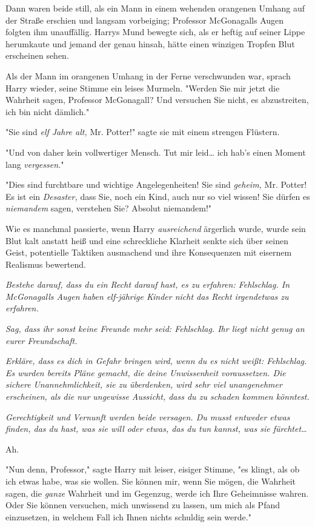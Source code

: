 {Dann waren beide still, als ein Mann in einem wehenden orangenen Umhang auf der Straße erschien und langsam vorbeiging; Professor McGonagalls Augen folgten ihm unauffällig. Harrys Mund bewegte sich, als er heftig auf seiner Lippe herumkaute und jemand der genau hinsah, hätte einen winzigen Tropfen Blut erscheinen sehen.

Als der Mann im orangenen Umhang in der Ferne verschwunden war, sprach Harry wieder, seine Stimme ein leises Murmeln. "Werden Sie mir jetzt die Wahrheit sagen, Professor McGonagall? Und versuchen Sie nicht, es abzustreiten, ich bin nicht dämlich."

"Sie sind \emph{elf Jahre alt,} Mr. Potter!" sagte sie mit einem strengen Flüstern.

"Und von daher kein vollwertiger Mensch. Tut mir leid… ich hab's einen Moment lang \emph{vergessen.}"

"Dies sind furchtbare und wichtige Angelegenheiten! Sie sind \emph{geheim,} Mr. Potter! Es ist ein \emph{Desaster,} dass Sie, noch ein Kind, auch nur so viel wissen! Sie dürfen es \emph{niemandem} sagen, verstehen Sie? Absolut niemandem!"

Wie es manchmal passierte, wenn Harry \emph{ausreichend} ärgerlich wurde, wurde sein Blut kalt anstatt heiß und eine schreckliche Klarheit senkte sich über seinen Geist, potentielle Taktiken ausmachend und ihre Konsequenzen mit eisernem Realismus bewertend.

\emph{Bestehe darauf, dass du ein Recht darauf hast, es zu erfahren: Fehlschlag. In McGonagalls Augen haben elf-jährige Kinder nicht das Recht irgendetwas zu erfahren.}

\emph{Sag, dass ihr sonst keine Freunde mehr seid: Fehlschlag. Ihr liegt nicht genug an eurer Freundschaft.}

\emph{Erkläre, dass es dich in Gefahr bringen wird, wenn du es nicht weißt: Fehlschlag. Es wurden bereits Pläne gemacht, die deine Unwissenheit voraussetzen. Die} \emph{sichere} \emph{\emph{Unannehmlichkeit, sie zu überdenken, wird sehr viel unangenehmer erscheinen, als die nur}} \emph{ungewisse} \emph{\emph{Aussicht, dass du zu schaden kommen könntest.}}

\emph{Gerechtigkeit und Vernunft werden beide versagen. Du musst entweder etwas finden, das du hast, was sie will oder etwas, das du tun kannst, was sie fürchtet…}

Ah.

"Nun denn, Professor," sagte Harry mit leiser, eisiger Stimme, "es klingt, als ob ich etwas habe, was sie wollen. Sie können mir, wenn Sie mögen, die Wahrheit sagen, die \emph{ganze} Wahrheit und im Gegenzug, werde ich Ihre Geheimnisse wahren. Oder Sie können versuchen, mich unwissend zu lassen, um mich als Pfand einzusetzen, in welchem Fall ich Ihnen nichts schuldig sein werde."

}

